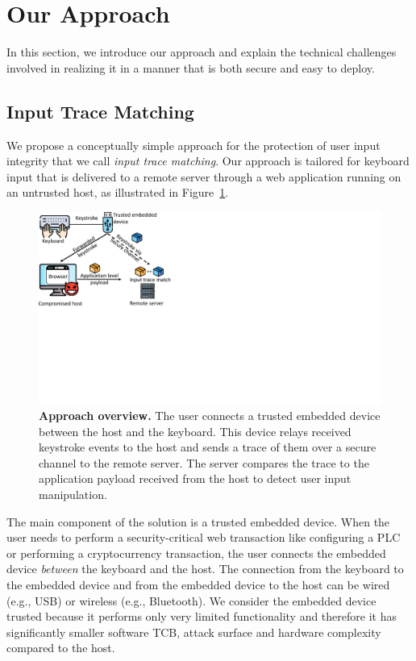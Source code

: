 \section{Our Approach}
\label{sec:ourApproach}

In this section, we introduce our approach and explain the technical challenges involved in realizing it in a manner that is both secure and easy to deploy. 

\subsection{Input Trace Matching}

We propose a conceptually simple approach for the protection of user input integrity that we call \emph{input trace matching}. Our approach is tailored for keyboard input that is delivered to a remote server through a web application running on an untrusted host, as illustrated in Figure~\ref{fig:abstractModel}. 

\begin{figure}[t]
 \centering
  \includegraphics[trim={0 9cm 19.5cm 0},clip,width=0.7\linewidth]{chapters/IntegriKey/images/AbstractModel.pdf}
 \caption[Approach overview]{\textbf{Approach overview.} The user connects a trusted embedded device between the host and the keyboard. This device relays received keystroke events to the host and sends a trace of them over a secure channel to the remote server. The server compares the trace to the application payload received from the host to detect user input manipulation.}
 
 \label{fig:abstractModel}
\end{figure}

The main component of the solution is a trusted embedded device. When the user needs to perform a security-critical web transaction like configuring a PLC or performing a cryptocurrency transaction, the user connects the embedded device \emph{between} the keyboard and the host. The connection from the keyboard to the embedded device and from the embedded device to the host can be wired (e.g., USB) or wireless (e.g., Bluetooth). We consider the embedded device trusted because it performs only very limited functionality and therefore it has significantly smaller software TCB, attack surface and hardware complexity compared to the host. 

